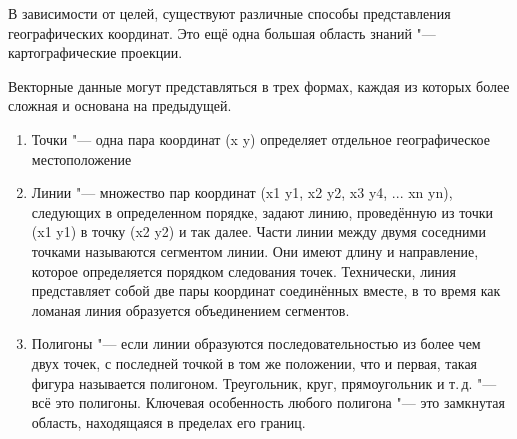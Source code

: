В зависимости от целей, существуют различные способы представления
географических координат. Это ещё одна большая область знаний "---
картографические проекции.

Векторные данные могут представляться в трех формах, каждая из которых
более сложная и основана на предыдущей.

\begin{enumerate}
\item Точки "--- одна пара координат (x y) определяет отдельное
географическое местоположение
\item Линии "--- множество пар координат (x1 y1, x2 y2, x3 y4, ... xn yn),
следующих в определенном порядке, задают линию, проведённую из точки
(x1 y1) в точку (x2 y2) и так далее. Части линии между двумя соседними точками
называются сегментом линии. Они имеют длину и направление, которое
определяется порядком следования точек. Технически, линия представляет
собой две пары координат соединённых вместе, в то время как ломаная
линия образуется объединением сегментов.
\item Полигоны "--- если линии образуются последовательностью из более
чем двух точек, с последней точкой в том же положении, что и первая,
такая фигура называется полигоном. Треугольник, круг, прямоугольник и т.\,д. "---
всё это полигоны. Ключевая особенность любого полигона "--- это замкнутая область,
находящаяся в пределах его границ.
\end{enumerate}
